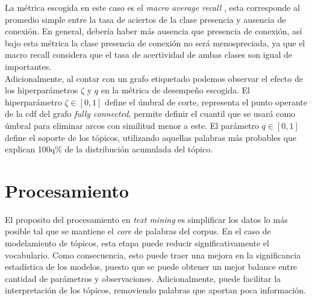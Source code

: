 \documentclass[letterpaper,12pt,oneside]{book} %
\begin{document}
La métrica escogida en este caso es el \textit{macro average recall} \citep{forman2003extensive}, esta corresponde al promedio simple entre la tasa de aciertos de la clase presencia y ausencia de conexión. En general, debería haber más ausencia que presencia de conexión, así bajo esta métrica la clase presencia de conexión no será menospreciada, ya que el macro recall considera que el tasa de acertividad de ambas clases son igual de importantes.\\

Adicionalmente, al contar con un grafo etiquetado podemos observar el efecto de los hiperparámetros $\zeta$ y $q$ en la métrica de desempeño escogida. El hiperparámetro $\zeta\in[0,1]$ define el úmbral de corte, representa el punto operante de la cdf del grafo \textit{fully connected}, permite definir el cuantil que se usará como úmbral para eliminar arcos con similitud menor a este. El parámetro $q \in [0,1]$ define el soporte de los tópicos, utilizando aquellas palabras más probables que explican 100q\% de la distribución acumulada del tópico. 

\section{Procesamiento}
\label{sec:processing}

El proposito del procesamiento en \textit{text mining} es simplificar los datos lo más posible tal que se mantiene el \textit{core} de palabras del corpus. En el caso de modelamiento de tópicos, esta etapa puede reducir significativamente el vocabulario. Como consecuencia, esto puede traer una mejora en la significancia estadística de los modelos, puesto que se puede obtener un mejor balance entre cantidad de parámetros y observaciones. Adicionalmente, puede facilitar la interpretación de los tópicos, removiendo palabras que aportan poca información.\\
\end{document}
